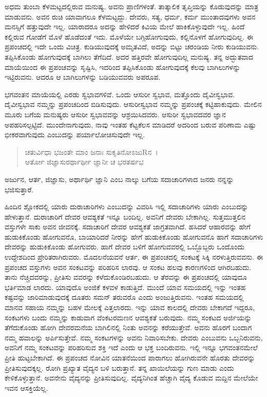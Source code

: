 ಅಧಮ ತುಂಬಾ ಕೆಳಮಟ್ಟದಲ್ಲಿರುವ ಮನುಷ್ಯ. ಅವನು ಪ್ರಾಣಿಗಳಂತೆ. ತಾತ್ಕಾಲಿಕ ತೃಪ್ತಿಯನ್ನು ಕೊಡುವುದನ್ನು ಮಾತ್ರ ಮಾಡುವನು. ಅವನ ರುಚಿ ಯಾವಾಗಲೂ ಕೆಳಮಟ್ಟದ್ದು. ದೇವರು, ಸತ್ಯ, ಧರ್ಮ, ಕರ್ಮ ಮುಂತಾದವುಗಳು ಅವನ ಮನಸ್ಸಿಗೆ ಹತ್ತುವುದೇ ಇಲ್ಲ. ಯಾರಾದರೂ ಅದನ್ನು ಹೇಳಿದರೆ ಕಿವಿಯ ಮೇಲೆ ಹಾಕಿಕೊಳ್ಳುವುದೇ ಇಲ್ಲ. ಹಿಂದೆ ಕಲ್ಲಿರುವ ಗೋಡೆಗೆ ಮೊಳೆ ಹೊಡೆದಂತೆ ಇದು. ಮೊಳೆಯೇ ಬಗ್ಗಿಹೋಗುವುದು, ಕಲ್ಲಿನೊಳಗೆ ಹೋಗುವುದಿಲ್ಲ. ಈ ಪ್ರಪಂಚದಲ್ಲಿ ಇದೇ ಒಂದು ವಿಚಿತ್ರ. ಕುಡಿಯುವುದಕ್ಕೆ ಅಮೃತವಿದೆ, ಅದನ್ನು ಬಿಟ್ಟು ಚರಂಡಿಯ ನೀರು ಕುಡಿಯುವನು. ತಪ್ಪಿಸಿಕೊಂಡು ಹೋಗುವುದಕ್ಕೆ ಬಾಗಿಲು ತೆಗೆದಿದೆ. ಅದರ ಹತ್ತಿರವೇ ಹೋಗುವುದಿಲ್ಲ ಮನುಷ್ಯ. ತನ್ನ ಅದ್ಭುತವಾದ ಮಾಯೆಯಿಂದ ಈ ಪ್ರಪಂಚವನ್ನು ಸೃಷ್ಟಿಸಿ, ಇದರಿಂದ ತಪ್ಪಿಸಿಕೊಂಡು ಹೋಗುವುದಕ್ಕೆ ಕೆಲವು ಬಾಗಿಲುಗಳನ್ನು ಇಟ್ಟಿರುವನು. ಆದರೂ ಆ ಬಾಗಿಲುಗಳನ್ನು ಬಡಿಯುವವರು ಅಪರೂಪ. 

ಭಗವಂತನ ಮಾಯೆಯಲ್ಲಿ ಎರಡು ಸ್ವಭಾವಗಳಿವೆ. ಒಂದು ಆಸುರೀ ಸ್ವಭಾವ, ಮತ್ತೊಂದು ದೈವೀಸ್ವಭಾವ. ದೈವೀಸ್ವಭಾವ ನಮ್ಮನ್ನು ಪ್ರಪಂಚದಿಂದ ಬಿಡಿಸುವುದು. ಆಸುರೀಸ್ವಭಾವ ನಮ್ಮನ್ನು ಪ್ರಪಂಚಕ್ಕೆ ಕಟ್ಟಿಹಾಕುವುದು. ಮೇಲಿನ ಮೂರು ಬಗೆಯ ಮನುಷ್ಯರು ಆಸುರೀ ಸ್ವಭಾವವನ್ನು ಆಶ್ರಯಿಸಿದವರು. ಆಸುರೀ ಸ್ವಭಾವದವರ ಜ್ಞಾನ ಅಪಹರಿಸಲ್ಪಟ್ಟಿದೆ. ಮುಂದೇನಾಗುವುದು, ನಾವು ಇಂತಹ ಕೆಟ್ಟಕೆಲಸ ಮಾಡಿದರೆ ಅದರಿಂದ ಬರುವ ಪರಿಣಾಮ ಎಷ್ಟು ಭೀಕರವಾಗುವುದು ಎಂಬುದನ್ನು ಪರ್ಯಾಲೋಚಿಸುವುದೇ ಇಲ್ಲ.

\begin{verse}
ಚತುರ್ವಿಧಾ ಭಜಂತೇ ಮಾಂ ಜನಾಃ ಸುಕೃತಿನೋಽಜುRನ~।\\ಆರ್ತೋ ಜಿಜ್ಞಾಸುರರ್ಥಾರ್ಥೀ ಜ್ಞಾನೀ ಚ ಭರತರ್ಷಭ 
\end{verse}

{\small ಅರ್ಜುನ, ಆರ್ತ, ಜಿಜ್ಞಾಸು, ಅರ್ಥಾರ್ಥಿ ಜ್ಞಾನಿ ಎಂಬ ನಾಲ್ಕು ಬಗೆಯ ಸದಾಚಾರಿಗಳಾದ ಜನರು ನನ್ನನ್ನು ಭಜಿಸುತ್ತಾರೆ.}

ಹಿಂದಿನ ಶ್ಲೋಕದಲ್ಲಿ ಯಾರು ದುರಾಚಾರಿಗಳು ಎಂಬುದನ್ನು ವಿವರಿಸಿ ಇಲ್ಲಿ ಸದಾಚಾರಿಗಳು ಯಾರು ಎಂಬುದನ್ನು ಹೇಳುತ್ತಾನೆ. ದುರಾಚಾರಿಗೆ ದೇವರ ಆವಶ್ಯಕತೆ ಇನ್ನೂ ಬಂದಿಲ್ಲ. ಅವನಿಗೆ ದೇವರು ಬೇಕಾಗಿಲ್ಲ. ಸುತ್ತಮುತ್ತಲಿನ ವಸ್ತುಗಳೇ ಸಾಕು ಅವನ ಜೀವನಕ್ಕೆ. ಸದಾಚಾರಿಗೆ ದೇವರ ಆವಶ್ಯಕತೆ ಜಾಗ್ರತವಾಗಿದೆ. ಹಸಿದರೆ ಆಹಾರವನ್ನು ಹೇಗೆ ಹುಡುಕಿಕೊಂಡು ಹೋಗುವನೊ, ಬಾಯಾರಿದರೆ ನೀರನ್ನು ಹೇಗೆ ಹುಡುಕಿಕೊಂಡು ಹೋಗುವನೊ ಹಾಗೆ ಸದಾಚಾರಿಗಳು ದೇವರನ್ನು ಹುಡುಕಿಕೊಂಡು ಹೋಗುವರು. ಹಾಗೆ ದೇವರ ಬಳಿಗೆ ಹೋಗುವವರಲ್ಲಿ ಒಬ್ಬೊಬ್ಬರು ಒಂದೊಂದು ಉದ್ದೇಶದಿಂದ ಪ್ರೇರಿತರಾಗಿರುವರು. ಮೊದಲನೆಯವನೆ ಆರ್ತ, ಈ ಪ್ರಪಂಚದಲ್ಲಿ ಸಂಕಟಕ್ಕೆ ಸಿಕ್ಕಿ ನರಳುತ್ತಿರುವವನು. ಈ ಪ್ರಪಂಚದ ವಸ್ತುಗಳು ಅವನ ಸಂಕಟವನ್ನು ಪರಿಹರಿಸ ಲಾರವು. ಆ ಸಂಕಟ ಹಲವು ಕಾರಣಗಳಿಂದ ಆಗಿರಬಹುದು. ತಾನು ನೆಚ್ಚಿದವರನ್ನು, ಪ್ರೀತಿಸು ವವರನ್ನು ಕಳೆದುಕೊಂಡಿರಬಹುದು. ಆ ತೆರವನ್ನು ಈ ಪ್ರಪಂಚದಲ್ಲಿ ಯಾವುದೂ ಭರ್ತಿಮಾಡ ಲಾರದು. ಯಾವುದೊ ಅಂಜಿಕೆ ಕಳವಳ ಕಾಡುತ್ತಿದೆ. ಮುಂದೆ ಯಾವ ಸಮಯದಲ್ಲಿ ಇನ್ನು ಇಂತಹ ಕಷ್ಟವನ್ನು ಜಾರಿಮಾಡುವುದಕ್ಕೆ ದೂತರು ಸಮನ್ ತರುವರೊ ಎಂದು ಅಂಜುತ್ತಿರುವನು. ಇಂತಹ ಸಮಯದಲ್ಲಿ ಮಾನವ ಸಹಾಯ ನಮ್ಮನ್ನು ಬಹಳ ಮೇಲಕ್ಕೆ ಎತ್ತಲಾರದು. ಇನ್ನು ಯಾವ ಕಾಲದಲ್ಲಿ ದೇವರು ಬೇಕಾಗದೆ ಇದ್ದರೂ, ಸಂಕಟಗಳು ಬಂದು ನಮ್ಮನ್ನು ಕಾಡುವಾಗ ವೆಂಕಟರಮಣನ ಆವಶ್ಯಕತೆ ಬರುವುದು. ನಮ್ಮ ಸಂಕಟದ ಅರ್ಜಿಯನ್ನು ತೆಗೆದುಕೊಂಡು ಹೋಗಿ ದೇವರಮನೆಯ ಬಾಗಿಲಿನಲ್ಲಿ ನಿಂತು ಅವನನ್ನು ಕರೆಯುತ್ತೇವೆ. ಅವನು ಹೊರಗೆ ಬಂದಾಗ ನಮ್ಮ ಹವಾಲನ್ನು ಅರ್ಪಿಸುತ್ತೇವೆ. ನಮ್ಮ ಸಂಕಟಗಳನ್ನು ಅವನು ನಿವಾರಿಸಬೇಕು. ದೇವರು ಎಂಬುವನು ಒಬ್ಬನಿರುವನು, ಅವನಿಗೆ ನಮ್ಮ ಸಂಕಟವನ್ನು ಪರಿಹರಿಸುವ ಶಕ್ತಿ ಇದೆ ಎಂದು ಆ ಭಕ್ತ ಬಂದಿರುವನು. ಇಲ್ಲಿ ಇನ್ನೂ ಭಗವಂತನಮೇಲೆ ಪ್ರೀತಿ ಹುಟ್ಟಬೇಕಾಗಿದೆ. ಈ ಪ್ರಪಂಚದ ನೋವಿನ ಯಾತನೆಯಿಂದ ಪಾರಾಗಲು ಹೋಗಿರುವನೇ ಹೊರತು ದೇವರನ್ನು ಪ್ರೀತಿಸುವುದಕ್ಕಲ್ಲ. ರೋಗಿ ಪ್ರಖ್ಯಾತ ವೈದ್ಯನ ಬಳಿ ಬರುತ್ತಾನೆ. ತನ್ನ ಖಾಯಿಲೆಯನ್ನು ಗುಣ ಮಾಡು ಎಂದು ಕೇಳಿಕೊಳ್ಳುತ್ತಾನೆ. ಅವನೇನು ವೈದ್ಯನನ್ನು ಪ್ರೀತಿಸುವುದಿಲ್ಲ. ವೈದ್ಯನಿಗಿಂತ ಹೆಚ್ಚಾಗಿ ವೈದ್ಯ ಕೊಡುವ ಮದ್ದಿನ ಮೇಲೆಯೇ ಇವನ ಆಸಕ್ತಿಯೆಲ್ಲ.

